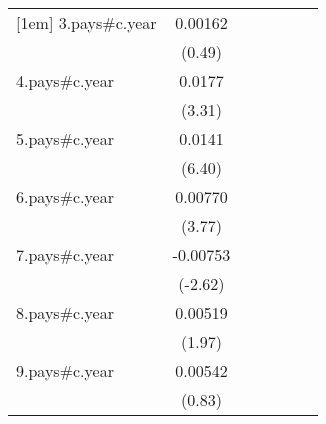 {\begin{tabular}{l*{6}{c}}
[1em]
3.pays#c.year       &     0.00162         &                     &                     &                     &                     &                     \\
                    &      (0.49)         &                     &                     &                     &                     &                     \\
[1em]
4.pays#c.year       &      0.0177\sym{***}&                     &                     &                     &                     &                     \\
                    &      (3.31)         &                     &                     &                     &                     &                     \\
[1em]
5.pays#c.year       &      0.0141\sym{***}&                     &                     &                     &                     &                     \\
                    &      (6.40)         &                     &                     &                     &                     &                     \\
[1em]
6.pays#c.year       &     0.00770\sym{***}&                     &                     &                     &                     &                     \\
                    &      (3.77)         &                     &                     &                     &                     &                     \\
[1em]
7.pays#c.year       &    -0.00753\sym{**} &                     &                     &                     &                     &                     \\
                    &     (-2.62)         &                     &                     &                     &                     &                     \\
[1em]
8.pays#c.year       &     0.00519\sym{*}  &                     &                     &                     &                     &                     \\
                    &      (1.97)         &                     &                     &                     &                     &                     \\
[1em]
9.pays#c.year       &     0.00542         &                     &                     &                     &                     &                     \\
                    &      (0.83)         &                     &                     &                     &                     &                     \\

\end{tabular}}
